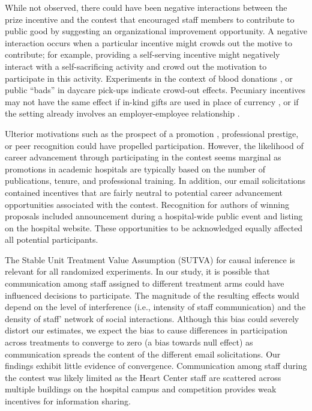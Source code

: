 \documentclass[12pt, titlepage]{article}
\begin{document}
While not observed, there could have been negative interactions between
the prize incentive and the contest that encouraged staff members to
contribute to public good by suggesting an organizational improvement
opportunity. A negative interaction occurs when a particular incentive
might crowds out the motive to contribute; for example, providing a
self-serving incentive might negatively interact with a self-sacrificing
activity and crowd out the motivation to participate in this activity.
Experiments in the context of blood donations
\citep{lacetera2013economic, lacetera2014rewarding}, or public ``bads''
in daycare pick-ups \citep{gneezy2000fine} indicate crowd-out effects.
Pecuniary incentives may not have the same effect if in-kind gifts are
used in place of currency \citep[e.g.,][]{kube2012currency}, or if the
setting already involves an employer-employee relationship
\citep[e.g,][]{fehr1998gift}.

Ulterior motivations such as the prospect of a promotion
\citep{baker1994internal, gibbs1995incentive}, professional prestige, or
peer recognition \citep{kosfeld2011getting, blanes2011tournaments} could
have propelled participation. However, the likelihood of career
advancement through participating in the contest seems marginal as
promotions in academic hospitals are typically based on the number of
publications, tenure, and professional training. In addition, our email
solicitations contained incentives that are fairly neutral to potential
career advancement opportunities associated with the contest.
Recognition for authors of winning proposals included announcement
during a hospital-wide public event and listing on the hospital website.
These opportunities to be acknowledged equally affected all potential
participants.

The Stable Unit Treatment Value Assumption (SUTVA) for causal inference
\citep{rubin1974estimating} is relevant for all randomized experiments.
In our study, it is possible that communication among staff assigned to
different treatment arms could have influenced decisions to participate.
The magnitude of the resulting effects would depend on the level of
interference (i.e., intensity of staff communication) and the density of
staff' network of social interactions. Although this bias could severely
distort our estimates, we expect the bias to cause differences in
participation across treatments to converge to zero (a bias towards null
effect) as communication spreads the content of the different email
solicitations. Our findings exhibit little evidence of convergence.
Communication among staff during the contest was likely limited as the
Heart Center staff are scattered across multiple buildings on the
hospital campus and competition provides weak incentives for information
sharing.
\end{document}
